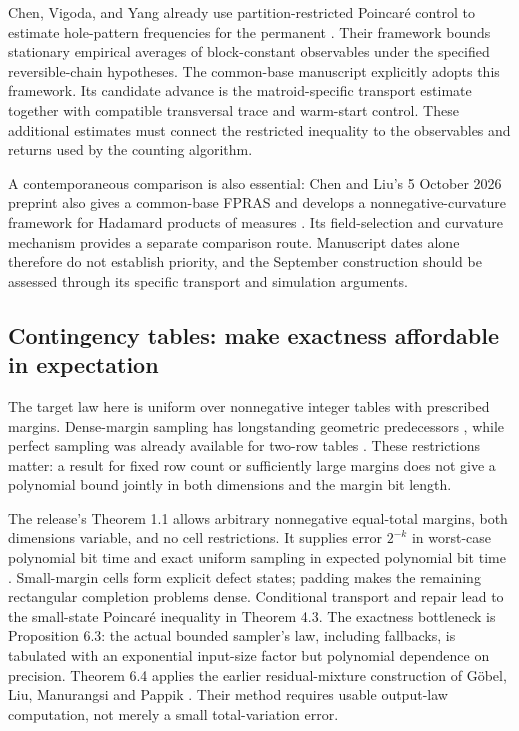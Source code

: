 Chen, Vigoda, and Yang already use partition-restricted Poincar\'e
control to estimate hole-pattern frequencies for the permanent
\cite[Definition~4 and Theorem~5(ii)]{FrontCVY2026}. Their framework
bounds stationary empirical averages of block-constant observables
under the specified reversible-chain hypotheses. The common-base
manuscript explicitly adopts this framework. Its candidate advance is
the matroid-specific transport estimate together with compatible
transversal trace and warm-start control. These additional estimates
must connect the restricted inequality to the observables and returns
used by the counting algorithm.

A contemporaneous comparison is also essential:
Chen and Liu's 5 October 2026 preprint also gives a common-base FPRAS
and develops a nonnegative-curvature framework for Hadamard products of
measures \cite{FrontChenLiu2026}. Its field-selection and curvature mechanism
provides a separate comparison route. Manuscript dates alone therefore
do not establish priority, and the September construction should be assessed
through its specific transport and simulation arguments.

\subsection{Contingency tables: make exactness affordable in expectation}

The target law here is uniform over nonnegative integer tables with prescribed
margins. Dense-margin sampling has longstanding geometric predecessors
\cite{FrontDKM1997,FrontMorris2002}, while perfect sampling was already available
for two-row tables \cite{FrontKijimaMatsui2003}. These restrictions matter:
a result for fixed row count or sufficiently large margins does not give
a polynomial bound jointly in both dimensions and the margin bit length.

The release's Theorem 1.1 allows arbitrary nonnegative equal-total margins,
both dimensions variable, and no cell restrictions. It supplies error
\(2^{-k}\) in worst-case polynomial bit time and exact uniform sampling in
expected polynomial bit time \cite{FrontOpenAITables}. Small-margin cells
form explicit defect states; padding makes the remaining rectangular
completion problems dense. Conditional transport and repair lead to the
small-state Poincar\'e inequality in Theorem 4.3. The exactness bottleneck
is Proposition 6.3: the actual bounded sampler's law, including fallbacks,
is tabulated with an exponential input-size factor but polynomial dependence
on precision. Theorem 6.4 applies the earlier residual-mixture construction
of G\"obel, Liu, Manurangsi and Pappik \cite{FrontGLMP2024}.
Their method requires usable output-law computation, not merely a small
total-variation error.

